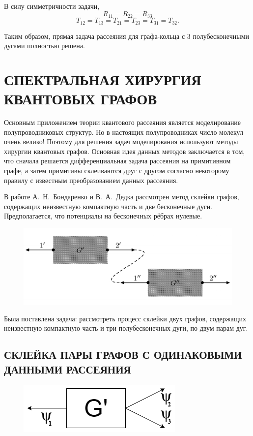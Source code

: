 \documentclass[a4 paper, 12 pt]{extarticle}
\begin{document}
   В силу симметричности задачи,
      \[R_{11} = R_{22} = R_{33}\]
   \[T_{12} = T_{13} = T_{21} = T_{23} = T_{31} = T_{32}.\]
   
   Таким образом, прямая задача рассеяния для графа-кольца с 3 полубесконечными дугами полностью решена.
   

   
   \pagebreak
   
   \section{СПЕКТРАЛЬНАЯ ХИРУРГИЯ КВАНТОВЫХ ГРАФОВ}
   Основным приложением теории квантового рассеяния является моделирование полупроводниковых структур. Но в настоящих полупроводниках число молекул очень велико! Поэтому для решения задач моделирования используют методы хирургии квантовых графов. Основная идея данных методов заключается в том, что сначала решается дифференциальная задача рассеяния на примитивном графе, а затем примитивы склеиваются друг с другом согласно некоторому правилу с известным преобразованием данных рассеяния.
   
   В работе А.~Н.~Бондаренко и В.~А.~Дедка \cite{SpectralSurgery} рассмотрен метод склейки графов, содержащих неизвестную компактную часть и две бесконечные дуги. Предполагается, что потенциалы на бесконечных рёбрах нулевые.
   \begin{figure}[!htb]
   	\centering
   	\includegraphics[scale=0.3]{skleika1.png}
   \end{figure}

   Была поставлена задача: рассмотреть процесс склейки двух графов, содержащих неизвестную компактную часть и три полубесконечных дуги, по двум парам дуг.
   
   \subsection{СКЛЕЙКА ПАРЫ ГРАФОВ С ОДИНАКОВЫМИ ДАННЫМИ РАССЕЯНИЯ}
   \begin{figure}[!htb]
   	\centering
   	\includegraphics[scale=0.5]{g_prime.png}
   \end{figure}
\end{document}
